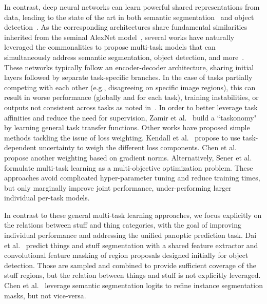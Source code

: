 \documentclass[10pt,twocolumn]{article}
\begin{document}
In contrast, deep neural networks can learn powerful shared representations from data, leading to the state of the art in both semantic segmentation~\cite{bulo2017place, zhao2017pyramid, deeplabv3plus2018} and object detection~\cite{ren2015faster, pinheiro2015learning, he2017mask, liu2018path}.
As the corresponding architectures share fundamental similarities inherited from the seminal AlexNet model~\cite{Krizhevsky2012}, several works have naturally leveraged the commonalities to propose multi-task models that can simultaneously address semantic segmentation, object detection, and more~\cite{uhrig2016pixel, kendall2017multi, kokkinos2017ubernet, neven2017fast, teichmann2018multinet}.
These networks typically follow an encoder-decoder architecture, sharing initial layers followed by separate task-specific branches.
In the case of tasks partially competing with each other (e.g., disagreeing on specific image regions), this can result in worse performance (globally and for each task), training instabilities, or outputs not consistent across tasks as noted in~\cite{kirillov2018panoptic}.
In order to better leverage task affinities and reduce the need for supervision, Zamir et al.~\cite{zamir2018taskonomy} build a ``taskonomy" by learning general task transfer functions.
Other works have proposed simple methods tackling the issue of loss weighting. Kendall et al.~\cite{kendall2017multi} propose to use task-dependent uncertainty to weigh the different loss components. Chen et al.~\cite{chen2017gradnorm} propose another weighting based on gradient norms.
Alternatively, Sener et al.~\cite{sener2018multi} formulate multi-task learning as a multi-objective optimization problem.
These approaches avoid complicated hyper-parameter tuning and reduce training times, but only marginally improve joint performance, under-performing larger individual per-task models.



In contrast to these general multi-task learning approaches, we focus explicitly on the relations between stuff and thing categories, with the goal of improving individual performance and addressing the unified panoptic prediction task.
Dai et al.~\cite{dai2015convolutional} predict things and stuff segmentation with a shared feature extractor and convolutional feature masking of region proposals designed initially for object detection. Those are sampled and combined to provide sufficient coverage of the stuff regions, but the relation between things and stuff is not explicitly leveraged.
Chen et al.~\cite{chen2017masklab} leverage semantic segmentation logits to refine instance segmentation masks, but not vice-versa.
\end{document}
